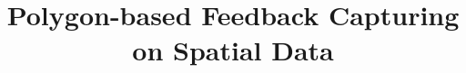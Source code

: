 \documentclass{vldb}
\begin{document}

\title{Polygon-based Feedback Capturing on Spatial Data}




%
%
%
%

\end{document}
